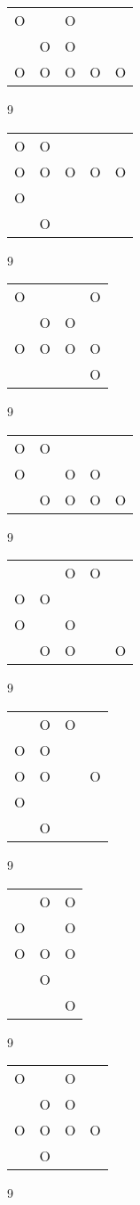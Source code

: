 \begin{tabular}{|m{0.2cm}m{0.2cm}m{0.2cm}m{0.2cm}m{0.2cm}|}\hline
O& &O& & \\
 &O&O& & \\
O&O&O&O&O\\
\hline\end{tabular}9
\begin{tabular}{|m{0.2cm}m{0.2cm}m{0.2cm}m{0.2cm}m{0.2cm}|}\hline
O&O& & & \\
O&O&O&O&O\\
O& & & & \\
 &O& & & \\
\hline\end{tabular}9
\begin{tabular}{|m{0.2cm}m{0.2cm}m{0.2cm}m{0.2cm}|}\hline
O& & &O\\
 &O&O& \\
O&O&O&O\\
 & & &O\\
\hline\end{tabular}9
\begin{tabular}{|m{0.2cm}m{0.2cm}m{0.2cm}m{0.2cm}m{0.2cm}|}\hline
O&O& & & \\
O& &O&O& \\
 &O&O&O&O\\
\hline\end{tabular}9
\begin{tabular}{|m{0.2cm}m{0.2cm}m{0.2cm}m{0.2cm}m{0.2cm}|}\hline
 & &O&O& \\
O&O& & & \\
O& &O& & \\
 &O&O& &O\\
\hline\end{tabular}9
\begin{tabular}{|m{0.2cm}m{0.2cm}m{0.2cm}m{0.2cm}|}\hline
 &O&O& \\
O&O& & \\
O&O& &O\\
O& & & \\
 &O& & \\
\hline\end{tabular}9
\begin{tabular}{|m{0.2cm}m{0.2cm}m{0.2cm}|}\hline
 &O&O\\
O& &O\\
O&O&O\\
 &O& \\
 & &O\\
\hline\end{tabular}9
\begin{tabular}{|m{0.2cm}m{0.2cm}m{0.2cm}m{0.2cm}|}\hline
O& &O& \\
 &O&O& \\
O&O&O&O\\
 &O& & \\
\hline\end{tabular}9
